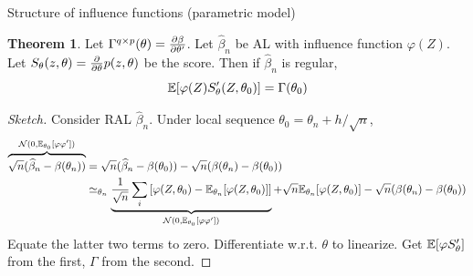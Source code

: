 \documentclass[10pt,aspectratio=169,handout]{beamer}
\theoremstyle{definition}
\newtheorem{thm}{Theorem}
\begin{document}
\begin{frame}{Structure of influence functions (parametric model)}
\small
    \begin{thm}
    Let $\Gamma^{q\times p}(\theta) = \frac{\partial{\beta}}{\partial{\theta'}}$.  
    Let $\hat \beta_n$ be AL with influence function
    $\varphi(Z)$.
    Let $S_\theta(z,\theta) = \frac{\partial{}}{\partial{\theta}} p(z,\theta)$ be the score.
    Then if
    $\hat\beta_n$ is regular, \[
    \mathbb{E}[\varphi(Z) S_\theta'(Z,\theta_0)] = \Gamma(\theta_0)
    \]
  \end{thm}
  
  \begin{proof}[Sketch]
    Consider RAL $\hat\beta_n$. Under local sequence $\theta_0 = \theta_n
    + h/\sqrt{n}$, \begin{align*}
         \overbrace{\sqrt{n} (\widehat\beta_n
        - \beta(\theta_n))}^{\mathcal{N}(0, \mathbb{E}_{\theta_0}[\varphi\varphi'])} &= \sqrt{n}(\widehat \beta_n
    - \beta(\theta_0)) - \sqrt{n}(\beta(\theta_n) - \beta(\theta_0)) \\ 
    &\simeq_{\theta_n} \underbrace{ \frac{1}{\sqrt{n}}\sum_i \left[{\varphi
    (Z,\theta_0) -
    \mathbb{E}_
            {\theta_n}[\varphi(Z, \theta_0)]}\right]}_{\mathcal{N}(0, \mathbb{E}_{\theta_0}
            [\varphi\varphi'])} + \sqrt{n}\mathbb{E}_{\theta_n}[\varphi
        (Z,\theta_0)] - \sqrt{n}(\beta(\theta_n) - \beta(\theta_0))
    \end{align*}
    Equate the latter two terms to zero. Differentiate w.r.t. $\theta$ to
    linearize. Get $\mathbb{E}[\varphi S'_\theta]$ from the first, $\Gamma$ from
    the second.
    \end{proof}
\end{frame}
\end{document}

